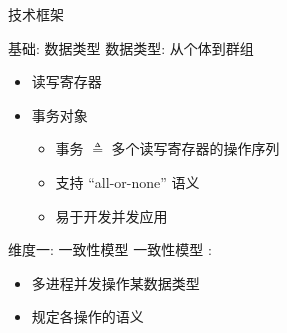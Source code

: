\begin{frame}{技术框架}
\end{frame}
\begin{frame}{基础: 数据类型}
	数据类型: 从个体到群组
	\pause
	\vspace{0.20cm}
	\begin{itemize}
	  \setlength{\itemsep}{8pt}
	  \item<2-> 读写寄存器
	  \item<3-> 事务对象
		\begin{itemize}
		  \setlength{\itemsep}{4pt}
		  \item 事务 $\triangleq$ 多个读写寄存器的操作序列
		  \item 支持 ``all-or-none'' 语义
		  \item 易于开发并发应用
		\end{itemize}
	\end{itemize}
\end{frame}
\begin{frame}{维度一: 一致性模型}
  一致性模型  :
  \vspace{0.20cm}
  \begin{itemize}
    \item 多进程并发操作某数据类型
	\item 规定各操作的语义
  \end{itemize}

  \vspace{0.20cm}
\end{frame}
